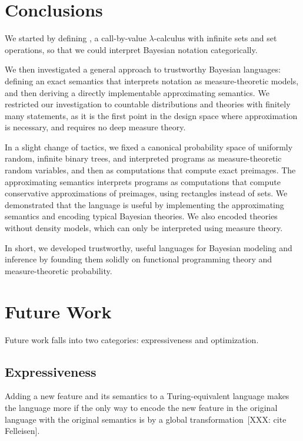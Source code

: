 
\section{Conclusions}

We started by defining \lzfclang, a call-by-value $\lambda$-calculus with infinite sets and set operations, so that we could interpret Bayesian notation categorically.

We then investigated a general approach to trustworthy Bayesian languages: defining an exact semantics that interprets notation as measure-theoretic models, and then deriving a directly implementable approximating semantics.
We restricted our investigation to countable distributions and theories with finitely many statements, as it is the first point in the design space where approximation is necessary, and requires no deep measure theory.

In a slight change of tactics, we fixed a canonical probability space of uniformly random, infinite binary trees, and interpreted programs as measure-theoretic random variables, and then as computations that compute exact preimages.
The approximating semantics interprets programs as computations that compute conservative approximations of preimages, using rectangles instead of sets.
We demonstrated that the language is useful by implementing the approximating semantics and encoding typical Bayesian theories.
We also encoded theories without density models, which can only be interpreted using measure theory.

In short, we developed trustworthy, useful languages for Bayesian modeling and inference by founding them solidly on functional programming theory and measure-theoretic probability.

\section{Future Work}

Future work falls into two categories: expressiveness and optimization.

\subsection{Expressiveness}

Adding a new feature and its semantics to a Turing-equivalent language makes the language more  if the only way to encode the new feature in the original language with the original semantics is by a global transformation~[XXX: cite Felleisen].

